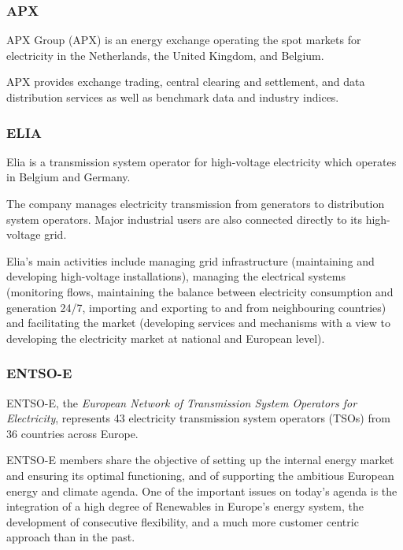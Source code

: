 
\subsubsection{APX}
    APX Group (APX) is an energy exchange operating the spot markets for electricity in the Netherlands, the United Kingdom, and Belgium.

    APX provides exchange trading, central clearing and settlement, and data distribution services as well as benchmark data and industry indices.\cite{bib:wikipedia:apx_group}

\subsubsection{ELIA}
    Elia is a transmission system operator for high-voltage electricity which operates in Belgium and Germany.
    
    The company manages electricity transmission from generators to distribution system operators.
    Major industrial users are also connected directly to its high-voltage grid.

    Elia's main activities include managing grid infrastructure (maintaining and developing high-voltage installations), managing the electrical systems (monitoring flows, maintaining the balance between electricity consumption and generation 24/7, importing and exporting to and from neighbouring countries) and facilitating the market (developing services and mechanisms with a view to developing the electricity market at national and European level).\cite{bib:wikipedia:elia}

\subsubsection{ENTSO-E} \label{section:providers:entsoe}
    ENTSO-E, the \textit{European Network of Transmission System Operators for Electricity}, represents 43 electricity transmission system operators (TSOs) from 36 countries across Europe.
    
    ENTSO-E members share the objective of setting up the internal energy market and ensuring its optimal functioning, and of supporting the ambitious European energy and climate agenda.
    One of the important issues on today’s agenda is the integration of a high degree of Renewables in Europe’s energy system, the development of consecutive flexibility, and a much more customer centric approach than in the past.\cite{bib:entsoe:info}

